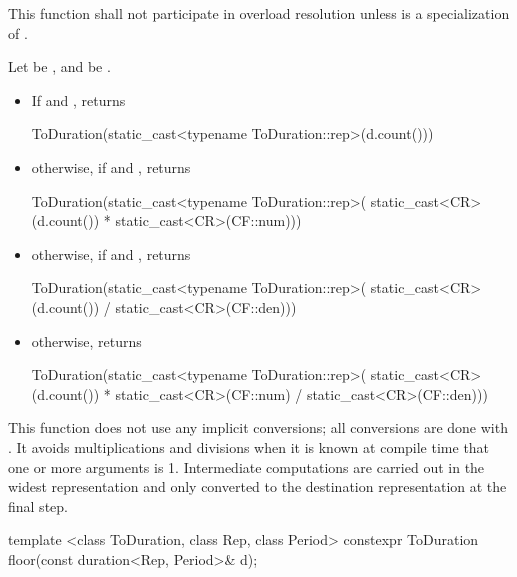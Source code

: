 \begin{itemdescr}
\pnum
\remarks This function shall not participate in overload resolution
unless  is a specialization of .

\pnum
\returns Let  be , and  be  .
\begin{itemize}
\item If  and , returns
\begin{codeblock}
ToDuration(static_cast<typename ToDuration::rep>(d.count()))
\end{codeblock}

\item otherwise, if  and , returns
\begin{codeblock}
ToDuration(static_cast<typename ToDuration::rep>(
  static_cast<CR>(d.count()) * static_cast<CR>(CF::num)))
\end{codeblock}

\item otherwise, if  and , returns
\begin{codeblock}
ToDuration(static_cast<typename ToDuration::rep>(
  static_cast<CR>(d.count()) / static_cast<CR>(CF::den)))
\end{codeblock}

\item otherwise, returns
\begin{codeblock}
ToDuration(static_cast<typename ToDuration::rep>(
  static_cast<CR>(d.count()) * static_cast<CR>(CF::num) / static_cast<CR>(CF::den)))
\end{codeblock}
\end{itemize}

\realnotes This function does not use any implicit conversions; all conversions
are done with . It avoids multiplications and divisions when
it is known at compile time that one or more arguments is 1. Intermediate
computations are carried out in the widest representation and only converted to
the destination representation at the final step.
\end{itemdescr}

%
\begin{itemdecl}
template <class ToDuration, class Rep, class Period>
  constexpr ToDuration floor(const duration<Rep, Period>& d);
\end{itemdecl}

